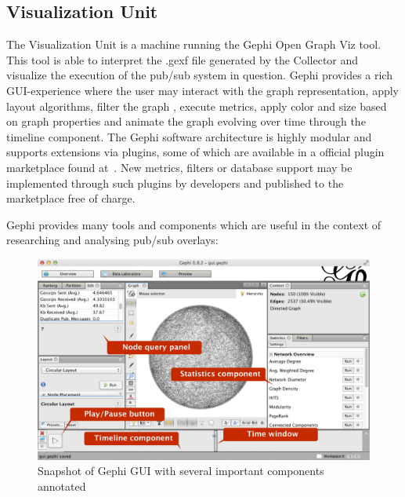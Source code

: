 \subsection{Visualization Unit}

The Visualization Unit is a machine running the Gephi Open Graph Viz
tool. This tool is able to interpret the .gexf file generated by the
Collector and visualize the execution of the pub/sub system in question.
Gephi provides a rich GUI-experience where the user may interact with
the graph representation, apply layout algorithms, filter the graph
, execute metrics, apply color and size based on graph
properties and animate the graph evolving over time through the timeline
component. The Gephi software architecture is highly modular and
supports extensions via plugins, some of which are available in a
official plugin marketplace found at~\cite{gephimarketplace}. New
metrics, filters or database support may be implemented through such
plugins by developers and published to the marketplace free of charge.

Gephi provides many tools and components which are useful in the context
of researching and analysing pub/sub overlays:

\begin{figure}[h]
    \centering
    \includegraphics[width=\textwidth]{figures/gui_ann}
    \caption{Snapshot of Gephi GUI with several important components
        annotated}
\end{figure}

